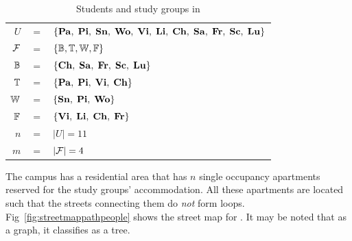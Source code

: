 \documentclass[MS,synopsis]{iitmdiss}
\begin{document}
\begin{table}[htbp]
  \centering
  { \footnotesize
  \begin{tabular}{rcl}
    $U $&$=$&$ \{{\bf Pa},\; {\bf Pi},\; {\bf Sn},\; {\bf Wo},\; {\bf Vi},\; {\bf Li},\; {\bf Ch},\;
    {\bf Sa},\; {\bf Fr},\; {\bf Sc},\; {\bf Lu}\}$\\
    ${\cal F} $&$=$&$ \{\mathbb{B}, \mathbb{T}, \mathbb{W}, \mathbb{F}\}$\\
    $\mathbb{B} $&$=$&$ \{{\bf Ch},\;  {\bf Sa},\;  {\bf Fr},\;  {\bf Sc},\;  {\bf Lu} \}$\\
    $\mathbb{T} $&$=$&$ \{{\bf Pa},\;  {\bf Pi},\;  {\bf Vi},\;  {\bf Ch} \}$\\
    $\mathbb{W} $&$=$&$ \{{\bf Sn},\;  {\bf Pi},\;  {\bf Wo} \}$\\
    $\mathbb{F} $&$=$&$ \{{\bf Vi},\;  {\bf Li},\;  {\bf Ch},\;  {\bf Fr} \}$\\
    $n $&$=$&$ |U| = 11$\\
    $m $&$=$&$ |{\cal F}| = 4$      
  \end{tabular}
}
  \caption{\figtabsize Students and study groups in \WSI}
  \label{tab:wsigroups}
\end{table}

The campus has a residential area {\residenceblock} that has $n$
single occupancy apartments reserved for the study groups'
accommodation.  All these apartments are located such that the streets
connecting them do {\em not} form
loops. Fig~\ref{fig:streetmappathpeople} 
shows the street map for {\residenceblock}. It may be noted that as a
graph, it classifies as a tree.
\end{document}
